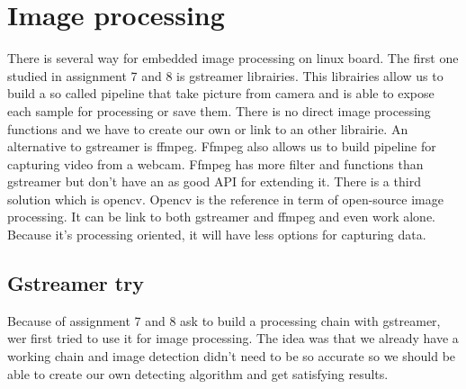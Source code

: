 \section{Image processing}

There is several way for embedded image processing on linux board. The first one studied in assignment 7 and 8 is gstreamer librairies. This librairies allow us to build a so called pipeline that take picture from camera and is able to expose each sample for processing or save them. There is no direct image processing functions and we have to create our own or link to an other librairie. An alternative to gstreamer is ffmpeg. Ffmpeg also allows us to build pipeline for capturing video from a webcam. Ffmpeg has more filter and functions than gstreamer but don't have an as good API for extending it. There is a third solution which is opencv. Opencv is the reference in term of open-source image processing. It can be link to both gstreamer and ffmpeg and even work alone. Because it's processing oriented, it will have less options for capturing data.

\subsection{Gstreamer try}

Because of assignment 7 and 8 ask to build a processing chain with gstreamer, wer first tried to use it for image processing. The idea was that we already have a working chain and image detection didn't need to be so accurate so we should be able to create our own detecting algorithm and get satisfying results.

